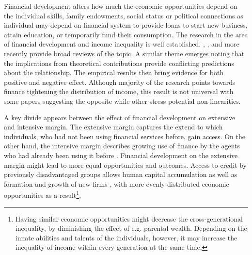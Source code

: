 \begin{refsection}



Financial development alters how much the economic opportunities depend on the individual skills, family endowments, social status or political connections as individual may depend on financial system to provide loans to start new business, attain education, or temporarily fund their consumption. The research in the area of financial development and income inequality is well established. \textcite{demirgucc2009finance}, \textcite{claessens2007finance}, and more recently \textcite{de2017finance} provide broad reviews of the topic. A similar theme emerges noting that the implications from theoretical contributions provide conflicting predictions about the relationship. The empirical results then bring evidence for both positive and negative effect. Although majority of the research points towards finance tightening the distribution of income, this result is not universal with some papers suggesting the opposite while other stress potential non-linearities.

A key divide appears between the effect of financial development on extensive and intensive margin. The extensive margin captures the extend to which individuals, who had not been using financial services before, gain access. On the other hand, the intensive margin describes growing use of finance by the agents who had already been using it before \parencite{demirgucc2009finance}. Financial development on the extensive margin might lead to more equal opportunities and outcomes. Access to credit by previously disadvantaged groups allows human capital accumulation \parencite{galorzeira1993income, galormoav2004, braunetal2019} as well as formation and growth of new firms \parencite{evans1989estimated, banerjeenewman1990}, with more evenly distributed economic opportunities as a result\footnote{Having similar economic opportunities might decrease the cross-generational inequality, by diminishing the effect of e.g. parental wealth. Depending on the innate abilities and talents of the individuals, however, it may increase the inequality of income within every generation at the same time.}.


\end{refsection}
